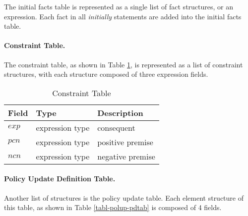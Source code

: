 \documentclass[11pt]{report}
\begin{document}
            The initial facts table is represented as a single list of
            fact structures, or an expression. Each fact in all {\em initially}
            statements are added into the initial facts table.

          \paragraph{Constraint Table.}

            The constraint table, as shown in Table \ref{tabl-polup-cntab}, is
            represented as a list of constraint structures, with each
            structure composed of three expression fields.

            \begin{table}[tbhp]
              \begin{center}
                \begin{tabular}[t]{|l|l|l|}
                  \hline
                  \textbf{Field} & \textbf{Type}   & \textbf{Description} \\
                  \hline
                  $exp$          & expression type & consequent \\
                  \hline
                  $pcn$          & expression type & positive premise \\
                  \hline
                  $ncn$          & expression type & negative premise \\
                  \hline
                \end{tabular}
              \end{center}
              \caption{Constraint Table}
              \label{tabl-polup-cntab}
            \end{table}

          \paragraph{Policy Update Definition Table.}

            Another list of structures is the policy update table. Each element
            structure of this table, as shown in Table \ref{tabl-polup-pdtab}
            is composed of 4 fields.
\end{document}
